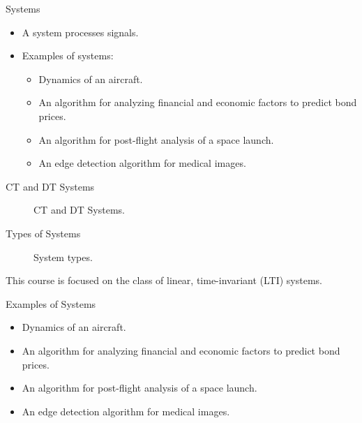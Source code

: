 \begin{frame}{Systems}
    \begin{itemize}[<+->]
        \item A system processes signals.
        \item Examples of systems:
            \begin{itemize}
                \item Dynamics of an aircraft.
                \item An algorithm for analyzing financial and economic factors to predict bond prices.
                \item An algorithm for post-flight analysis of a space launch.
                \item An edge detection algorithm for medical images.
            \end{itemize}
    \end{itemize}
\end{frame}

\begin{frame}[plain]{CT and DT Systems}
\begin{figure}
    \centering
        
        
    \caption{CT and DT Systems.}\label{fi:ct_dt_systems}
\end{figure}
\end{frame}

\begin{frame}[plain]{Types of Systems}
    \begin{figure}
        \centering
        
        \caption{System types.}\label{fi:system_types}
    \end{figure}
    This course is focused on the class of linear, time-invariant (LTI) systems.
\end{frame}


\begin{frame}{Examples of Systems}
    \begin{itemize}
      \item Dynamics of an aircraft.
      \item An algorithm for analyzing financial and economic factors to predict bond prices.
      \item An algorithm for post-flight analysis of a space launch.
      \item An edge detection algorithm for medical images.
    \end{itemize}
\end{frame}

